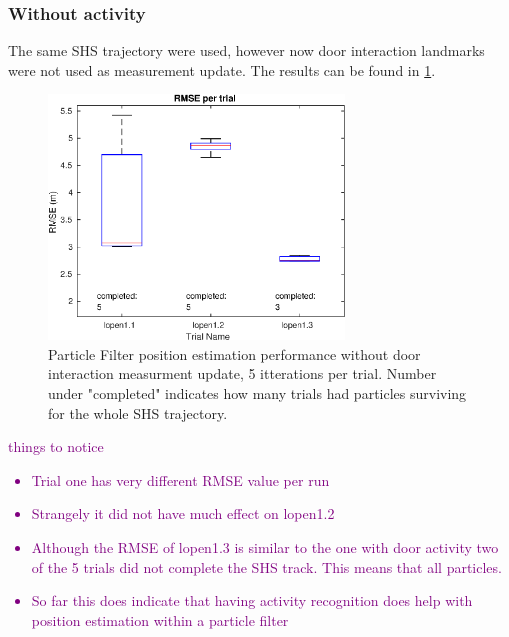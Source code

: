 \newpage
\subsubsection{Without activity}
The same SHS trajectory were used, however now door interaction landmarks were not used as measurement update. The results can be found in \cref{fig:pf_boxplot_no_doors}.

\begin{figure}[H]
	\centering
	\includegraphics[width=0.7\textwidth]{images/20201103_1128_with_doors_1}
	\caption[Particle Filter position estimation performance without door interaction]{Particle Filter position estimation performance without door interaction measurment update, 5 itterations per trial. Number under "completed" indicates how many trials had particles surviving for the whole SHS trajectory.}
	\label{fig:pf_boxplot_no_doors}
\end{figure}

\textcolor{purple}{
things to notice
\begin{itemize}
	\item Trial one has very different RMSE value per run
	\item Strangely it did not have much effect on lopen1.2
	\item Although the RMSE of lopen1.3 is similar to the one with door activity two of the 5 trials did not complete the SHS track. This means that all particles.
	\item So far this does indicate that having activity recognition does help with position estimation within a particle filter
\end{itemize}}
